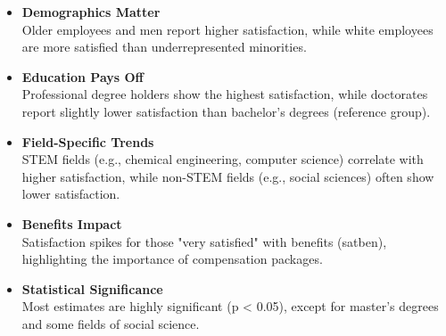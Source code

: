 \documentclass[12pt]{article}
\begin{document}
\begin{itemize}
    \item \textbf{Demographics Matter}\\
    Older employees and men report higher satisfaction, while white employees are more satisfied than underrepresented minorities.
    \item \textbf{Education Pays Off}\\
    Professional degree holders show the highest satisfaction, while doctorates report slightly lower satisfaction than bachelor’s degrees (reference group).
    \item \textbf{Field-Specific Trends}\\
    STEM fields (e.g., chemical engineering, computer science) correlate with higher satisfaction, while non-STEM fields (e.g., social sciences) often show lower satisfaction.
    \item \textbf{Benefits Impact}\\
    Satisfaction spikes for those "very satisfied" with benefits (satben), highlighting the importance of compensation packages.
    \item \textbf{Statistical Significance}\\
    Most estimates are highly significant (p < 0.05), except for master’s degrees and some fields of social science.
\end{itemize}
\end{document}
